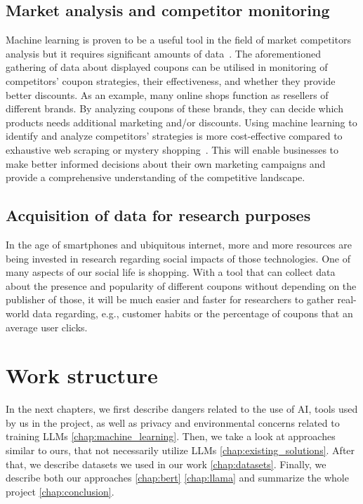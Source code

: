 \documentclass[licencjacka,en]{pracamgr}
\begin{document}
\subsection{Market analysis and competitor monitoring}
Machine learning is proven to be a useful tool in the field of market competitors analysis but it requires significant amounts of data~\cite{competitor_tariffs}.
The aforementioned gathering of data about displayed coupons can be utilised in monitoring of competitors' coupon strategies, their effectiveness, and whether they provide better discounts. As an example, many online shops function as resellers of different brands. By analyzing coupons of these brands, they can decide which products needs additional marketing and/or discounts. Using machine learning to identify and analyze competitors' strategies is more cost-effective compared to exhaustive web scraping or mystery shopping~\cite{competitor_tariffs}. This will enable businesses to make better informed decisions about their own marketing campaigns and provide a comprehensive understanding of the competitive landscape.

\subsection{Acquisition of data for research purposes}
In the age of smartphones and ubiquitous internet, more and more resources are being invested in research regarding social impacts of those technologies. One of many aspects of our social life is shopping. With a tool that can collect data about the presence and popularity of different coupons without depending on the publisher of those, it will be much easier and faster for researchers to gather real-world data regarding, e.g., customer habits or the percentage of coupons that an average user clicks.

\section{Work structure}
In the next chapters, we first describe dangers related to the use of AI, tools used by us in the project, as well as privacy and environmental concerns related to training LLMs \ref{chap:machine_learning}. Then, we take a look at approaches similar to ours, that not necessarily utilize LLMs \ref{chap:existing_solutions}. After that, we describe datasets we used in our work \ref{chap:datasets}. Finally, we describe both our approaches \ref{chap:bert} \ref{chap:llama} and summarize the whole project \ref{chap:conclusion}.
\end{document}

